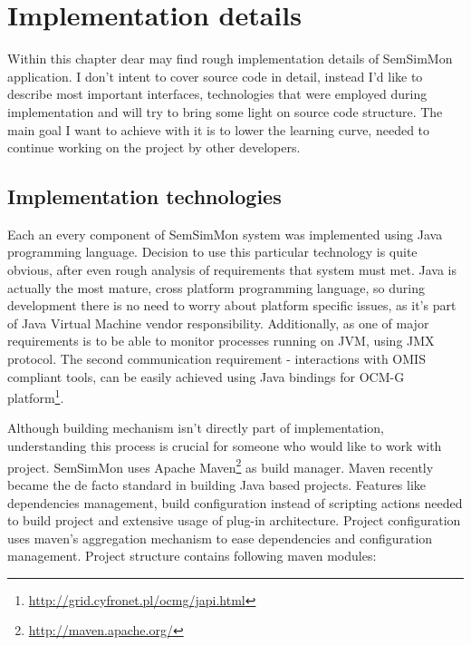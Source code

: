  
%


\chapter{Implementation details}
\label{cha:implementation}

Within this chapter dear may find rough implementation details of SemSimMon application. I don't intent to cover
source code in detail, instead I'd like to describe most important interfaces, technologies  that were
employed during implementation and will try to bring some light on source code structure. The main goal I want to
achieve with it is to lower the learning curve, needed to continue working on the project by other developers.


\section{Implementation technologies}

Each an every component of SemSimMon system was implemented using Java programming language. Decision to use this
particular technology is quite obvious, after even rough analysis of requirements that system must met. Java is
actually the most mature, cross platform programming language, so during development there is no need to worry about
platform specific issues, as it's part of Java Virtual Machine vendor responsibility. Additionally, as one of major
requirements is to be able to monitor processes running on JVM, using JMX protocol. The second communication
requirement - interactions with OMIS compliant tools, can be easily achieved using Java bindings for OCM-G
platform\footnote{\url{http://grid.cyfronet.pl/ocmg/japi.html}}.  

Although building mechanism isn't directly part of implementation, understanding this process is crucial for someone
who would like to work with project. SemSimMon uses Apache Maven\footnote{\url{http://maven.apache.org/}} as build
manager. Maven recently became the de facto standard in building Java based projects. Features like dependencies
management, build configuration instead of scripting actions needed to build project and extensive usage of plug-in
architecture. Project configuration uses maven's aggregation mechanism to ease dependencies and configuration
management. Project structure contains following maven modules:

